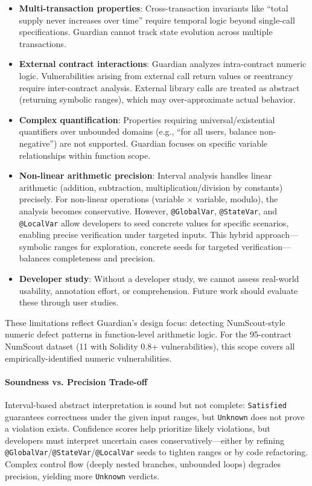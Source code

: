 \documentclass[pdflatex,sn-basic]{sn-jnl}%
\theoremstyle{thmstyleone}%
\theoremstyle{thmstyletwo}%
\theoremstyle{thmstylethree}%
\begin{document}
\begin{itemize}
\item \textbf{Multi-transaction properties}: Cross-transaction invariants like ``total supply never increases over time'' require temporal logic beyond single-call specifications. Guardian cannot track state evolution across multiple transactions.

\item \textbf{External contract interactions}: Guardian analyzes intra-contract numeric logic. Vulnerabilities arising from external call return values or reentrancy require inter-contract analysis. External library calls are treated as abstract (returning symbolic ranges), which may over-approximate actual behavior.

\item \textbf{Complex quantification}: Properties requiring universal/existential quantifiers over unbounded domains (e.g., ``for all users, balance non-negative'') are not supported. Guardian focuses on specific variable relationships within function scope.

\item \textbf{Non-linear arithmetic precision}: Interval analysis handles linear arithmetic (addition, subtraction, multiplication/division by constants) precisely. For non-linear operations (variable $\times$ variable, modulo), the analysis becomes conservative. However, \texttt{@GlobalVar}, \texttt{@StateVar}, and \texttt{@LocalVar} allow developers to seed concrete values for specific scenarios, enabling precise verification under targeted inputs. This hybrid approach—symbolic ranges for exploration, concrete seeds for targeted verification—balances completeness and precision.

\item \textbf{Developer study}: Without a developer study, we cannot assess real-world usability, annotation effort, or comprehension. Future work should evaluate these through user studies.
\end{itemize}

These limitations reflect Guardian's design focus: detecting NumScout-style numeric defect patterns in function-level arithmetic logic. For the 95-contract NumScout dataset (11 with Solidity 0.8+ vulnerabilities), this scope covers all empirically-identified numeric vulnerabilities.

\paragraph{Soundness vs. Precision Trade-off}
Interval-based abstract interpretation is sound but not complete: \texttt{Satisfied} guarantees correctness under the given input ranges, but \texttt{Unknown} does not prove a violation exists. Confidence scores help prioritize likely violations, but developers must interpret uncertain cases conservatively—either by refining \texttt{@GlobalVar}/\texttt{@StateVar}/\texttt{@LocalVar} seeds to tighten ranges or by code refactoring. Complex control flow (deeply nested branches, unbounded loops) degrades precision, yielding more \texttt{Unknown} verdicts.
\end{document}

